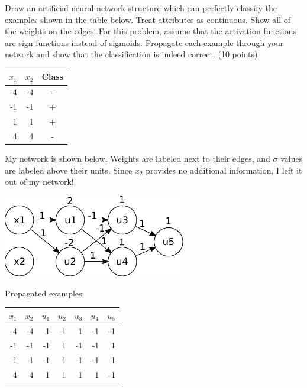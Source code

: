 \documentclass[fleqn]{homework}
\begin{document}
  \begin{problem}{3}
    \begin{question}
      Draw an artificial neural network structure which can perfectly classify
      the examples shown in the table below. Treat attributes as
      continuous. Show all of the weights on the edges. For this problem, assume
      that the activation functions are sign functions instead of
      sigmoids. Propagate each example through your network and show that the
      classification is indeed correct. (10 points)

      \begin{tabular}{|rr|c|}
        \hline
        $x_1$ & $x_2$ & Class \\
        \hline
        -4 & -4 & - \\
        -1 & -1 & + \\
        1 & 1 & + \\
        4 & 4 & - \\
        \hline
      \end{tabular}
    \end{question}

    My network is shown below.  Weights are labeled next to their edges, and
    $\sigma$ values are labeled above their units.  Since $x_2$ provides no
    additional information, I left it out of my network!
    \begin{center}
      \includegraphics[width=0.6\textwidth]{net.pdf}      
    \end{center}

    Propagated examples: \\

    \begin{tabular}{|rr|rrrrr|}
      \hline
      $x_1$ & $x_2$ & $u_1$ & $u_2$ & $u_3$ & $u_4$ & $u_5$ \\
      \hline
      -4 & -4 & -1 & -1 & 1 & -1 & -1 \\
      -1 & -1 & -1 & 1 & -1 & -1 & 1 \\
      1 & 1 & -1 & 1 & -1 & -1 & 1 \\
      4 & 4 & 1 & 1 & -1 & 1 & -1 \\
      \hline
    \end{tabular}
  \end{problem}
\end{document}
